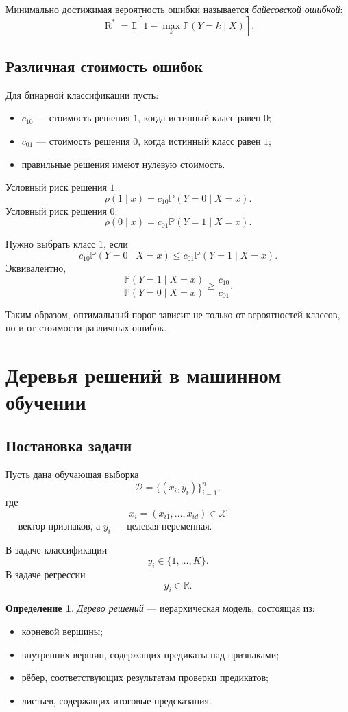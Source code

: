 \documentclass[12pt,a4paper]{article}
\theoremstyle{plain}
\theoremstyle{definition}
\newtheorem{definition}[theorem]{Определение}
\theoremstyle{remark}
\newcommand{\Pp}{\mathbb{P}}
\newcommand{\Ee}{\mathbb{E}}
\newcommand{\Rr}{\mathbb{R}}
\newcommand{\Risk}{\operatorname{R}}
\begin{document}
Минимально достижимая вероятность ошибки называется
\emph{байесовской ошибкой}:
\[
    \Risk^*
    =
    \Ee\left[
        1-\max_k \Pp(Y=k\mid X)
    \right].
\]

\subsection{Различная стоимость ошибок}

Для бинарной классификации пусть:
\begin{itemize}
    \item $c_{10}$ --- стоимость решения $1$, когда истинный класс равен
    $0$;
    \item $c_{01}$ --- стоимость решения $0$, когда истинный класс равен
    $1$;
    \item правильные решения имеют нулевую стоимость.
\end{itemize}

Условный риск решения $1$:
\[
    \rho(1\mid x)
    =
    c_{10}\Pp(Y=0\mid X=x).
\]
Условный риск решения $0$:
\[
    \rho(0\mid x)
    =
    c_{01}\Pp(Y=1\mid X=x).
\]

Нужно выбрать класс $1$, если
\[
    c_{10}\Pp(Y=0\mid X=x)
    \le
    c_{01}\Pp(Y=1\mid X=x).
\]
Эквивалентно,
\[
    \frac{\Pp(Y=1\mid X=x)}
         {\Pp(Y=0\mid X=x)}
    \ge
    \frac{c_{10}}{c_{01}}.
\]

Таким образом, оптимальный порог зависит не только от вероятностей
классов, но и от стоимости различных ошибок.

\section{Деревья решений в машинном обучении}

\subsection{Постановка задачи}

Пусть дана обучающая выборка
\[
    \mathcal{D}
    =
    \{(x_i,y_i)\}_{i=1}^{n},
\]
где
\[
    x_i=(x_{i1},\ldots,x_{id})\in\mathcal{X}
\]
--- вектор признаков, а $y_i$ --- целевая переменная.

В задаче классификации
\[
    y_i\in\{1,\ldots,K\}.
\]
В задаче регрессии
\[
    y_i\in\Rr.
\]

\begin{definition}
\emph{Дерево решений} --- иерархическая модель, состоящая из:
\begin{itemize}
    \item корневой вершины;
    \item внутренних вершин, содержащих предикаты над признаками;
    \item рёбер, соответствующих результатам проверки предикатов;
    \item листьев, содержащих итоговые предсказания.
\end{itemize}
\end{definition}
\end{document}
